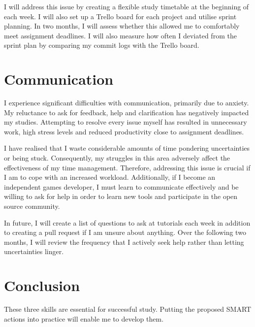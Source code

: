 \documentclass{scrartcl}
\begin{document}
I will address this issue by creating a flexible study timetable at the beginning of each week. I will also set up a Trello board for each project and utilise sprint planning. In two months, I will assess whether this allowed me to comfortably meet assignment deadlines. I will also measure how often I deviated from the sprint plan by comparing my commit logs with the Trello board.

\section{Communication}
I experience significant difficulties with communication, primarily due to anxiety. My reluctance to ask for feedback, help and clarification has negatively impacted my studies. Attempting to resolve every issue myself has resulted in unnecessary work, high stress levels and reduced productivity close to assignment deadlines.

I have realised that I waste considerable amounts of time pondering uncertainties or being stuck. Consequently, my struggles in this area adversely affect the effectiveness of my time management. Therefore, addressing this issue is crucial if I am to cope with an increased workload. Additionally, if I become an independent games developer, I must learn to communicate effectively and be willing to ask for help in order to learn new tools and participate in the open source community.

In future, I will create a list of questions to ask at tutorials each week in addition to creating a pull request if I am unsure about anything. Over the following two months, I will review the frequency that I actively seek help rather than letting uncertainties linger.

\section{Conclusion}
These three skills are essential for successful study. Putting the proposed SMART actions into practice will enable me to develop them.


\end{document}

